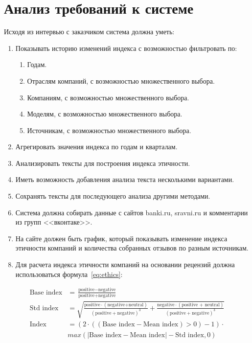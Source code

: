 \documentclass[PI, VKR]{HSEUniversity}
\begin{document}
\section{Анализ требований к системе}
\label{sec:org01a46d7}
Исходя из интервью с заказчиком система должна уметь:
\begin{enumerate}
\item Показывать историю изменений индекса с возможностью фильтровать по:
\begin{enumerate}
\item Годам.
\item Отраслям компаний, с возможностью множественного выбора.
\item Компаниям, с возможностью множественного выбора.
\item Моделям, с возможностью множественного выбора.
\item Источникам, с возможностью множественного выбора.
\end{enumerate}
\item Агрегировать значения индекса по годам и кварталам.
\item Анализировать тексты для построения индекса этичности.
\item Иметь возможность добавления анализа текста несколькими вариантами.
\item Сохранять тексты для последующего анализа другими методами.
\item Система должна собирать данные с сайтов banki.ru, sravni.ru и комментарии из групп {}<<вконтаке>>{}.
\item На сайте должен быть график, который показывать изменение индекса этичности компаний и количества собранных отзывов по разным источникам.
\item Для расчета индекса этичности компаний на основании рецензий должна использоваться формула~\ref{eq:ethics}:
\end{enumerate}
\begin{equation}
\label{eq:ethics}
\begin{aligned}
\text{Base index} &= \frac{\text{positive} - \text{negative}}{\text{positive} + \text{negative}} \\
\text{Std index} &= \sqrt{\frac{\text{positive}\cdot(\text{negative+neutral})}{(\text{positive} + \text{negative})^{3}} + \frac{\text{negative}\cdot(\text{positive + neutral})}{(\text{positive} + \text{negative})^{3}}} \\
\text{Index} &= ({2\cdot(({\text{Base index}}-{\text{Mean index}}) > 0) - 1})\cdot\\
            &{max\left(\left|{\text{Base index}}-{\text{Mean index}}\right|-{\text{Std index}}, 0\right)}
\end{aligned}
\end{equation}
\end{document}
